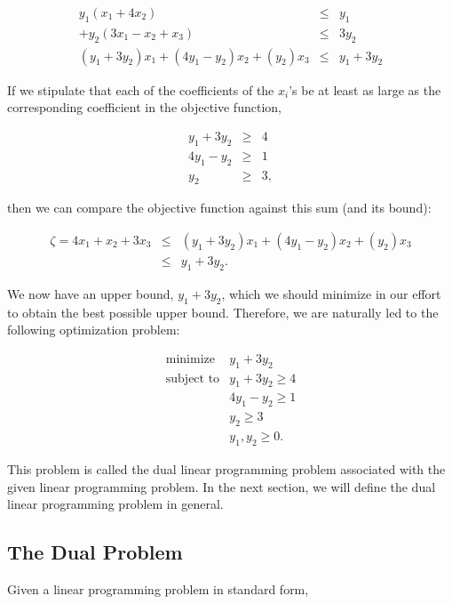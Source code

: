\documentclass{article}
\begin{document}
\[
\begin{array}{rcl}
y_{1}(x_{1} + 4x_{2}) & \leq & y_{1} \\
+ y_{2}(3x_{1} - x_{2} + x_{3}) & \leq & 3y_{2} \\
\hline
(y_{1} + 3y_{2})x_{1} + (4y_{1} - y_{2})x_{2} + (y_{2})x_{3} & \leq & y_{1} + 3y_{2}
\end{array}
\]

If we stipulate that each of the coefficients of the $x_{i}$'s be at least as large as the corresponding coefficient in the objective function,

\[
\begin{array}{rcl}
y_{1} + 3y_{2} & \geq & 4 \\
4y_{1} - y_{2} & \geq & 1 \\
y_{2} & \geq & 3,
\end{array}
\]

then we can compare the objective function against this sum (and its bound):

\[
\begin{array}{rcl}
\zeta = 4x_{1} + x_{2} + 3x_{3} & \leq & (y_{1} + 3y_{2})x_{1} + (4y_{1} - y_{2})x_{2} + (y_{2})x_{3} \\
& \leq & y_{1} + 3y_{2}.
\end{array}
\]

We now have an upper bound, $y_{1} + 3y_{2}$, which we should minimize in our effort to obtain the best possible upper bound. Therefore, we are naturally led to the following optimization problem:

\[
\begin{array}{ll}
\text{minimize} & y_{1} + 3y_{2} \\
\text{subject to} & y_{1} + 3y_{2} \geq 4 \\
& 4y_{1} - y_{2} \geq 1 \\
& y_{2} \geq 3 \\
& y_{1}, y_{2} \geq 0.
\end{array}
\]

This problem is called the dual linear programming problem associated with the given linear programming problem. In the next section, we will define the dual linear programming problem in general.

\subsection{The Dual Problem}

Given a linear programming problem in standard form,
\end{document}

